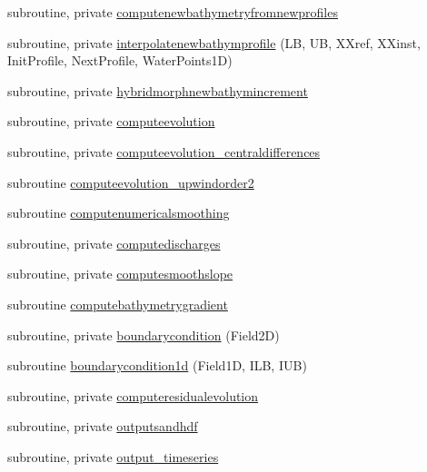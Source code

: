 \begin{DoxyCompactItemize}
\item 
subroutine, private \mbox{\hyperlink{namespacemodulesand_a27c9023e77c121f3086720bf6e9e8842}{computenewbathymetryfromnewprofiles}}
\item 
subroutine, private \mbox{\hyperlink{namespacemodulesand_abe7195f0a91ff792f6a36bea021901b1}{interpolatenewbathymprofile}} (LB, UB, X\+Xref, X\+Xinst, Init\+Profile, Next\+Profile, Water\+Points1D)
\item 
subroutine, private \mbox{\hyperlink{namespacemodulesand_a16ec0bd3dc1304583be21920d21c0a74}{hybridmorphnewbathymincrement}}
\item 
subroutine, private \mbox{\hyperlink{namespacemodulesand_ad15b8bd8644b2a7c104622be042c70be}{computeevolution}}
\item 
subroutine, private \mbox{\hyperlink{namespacemodulesand_a0a0730547aa0d650a7bcc24395ba4cea}{computeevolution\+\_\+centraldifferences}}
\item 
subroutine \mbox{\hyperlink{namespacemodulesand_ade72cd18189ac41b25eef5f7f97591dc}{computeevolution\+\_\+upwindorder2}}
\item 
subroutine \mbox{\hyperlink{namespacemodulesand_aa8ec28ffb1310d31679a5053863f3452}{computenumericalsmoothing}}
\item 
subroutine, private \mbox{\hyperlink{namespacemodulesand_a7c4449ee64c2b5e75dfe0924a2f83231}{computedischarges}}
\item 
subroutine, private \mbox{\hyperlink{namespacemodulesand_a2490457b0368770e3389caa5b86fbcec}{computesmoothslope}}
\item 
subroutine \mbox{\hyperlink{namespacemodulesand_a4fb9cf38c8854f5719cd1bd9633891ce}{computebathymetrygradient}}
\item 
subroutine, private \mbox{\hyperlink{namespacemodulesand_a24a6518a059721913dd87b9b1d7f2c4d}{boundarycondition}} (Field2D)
\item 
subroutine \mbox{\hyperlink{namespacemodulesand_ac5edc4e9b694ab004e67e47cc9a22566}{boundarycondition1d}} (Field1D, I\+LB, I\+UB)
\item 
subroutine, private \mbox{\hyperlink{namespacemodulesand_a4577ec7b0d16f959a488db5280c61154}{computeresidualevolution}}
\item 
subroutine, private \mbox{\hyperlink{namespacemodulesand_af453c334bacf72e34c80ff7d4a71fb1a}{outputsandhdf}}
\item 
subroutine, private \mbox{\hyperlink{namespacemodulesand_a88edcbeb020c6e5308ed19af4b7d4d46}{output\+\_\+timeseries}}
\item 

\end{DoxyCompactItemize}
